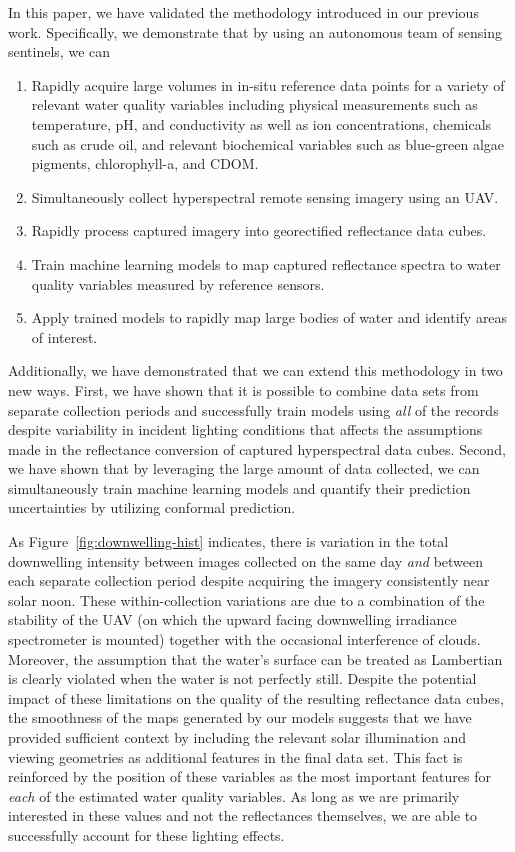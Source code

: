 \documentclass[remotesensing,article,submit,pdftex,moreauthors]{Definitions/mdpi}
\begin{document}
In this paper, we have validated the methodology introduced in our previous work\cite{robotTeam1}. Specifically, we demonstrate that by using an autonomous team of sensing sentinels, we can
\begin{enumerate}
    \item Rapidly acquire large volumes in in-situ reference data points for a variety of relevant water quality variables including physical measurements such as temperature, pH, and conductivity as well as ion concentrations, chemicals such as crude oil, and relevant biochemical variables such as blue-green algae pigments, chlorophyll-a, and CDOM. 
    \item Simultaneously collect hyperspectral remote sensing imagery using an UAV.
    \item Rapidly process captured imagery into georectified reflectance data cubes.
    \item Train machine learning models to map captured reflectance spectra to water quality variables measured by reference sensors.
    \item Apply trained models to rapidly map large bodies of water and identify areas of interest.
\end{enumerate}
Additionally, we have demonstrated that we can extend this methodology in two new ways. First, we have shown that it is possible to combine data sets from separate collection periods and successfully train models using \textit{all} of the records despite variability in incident lighting conditions that affects the assumptions made in the reflectance conversion of captured hyperspectral data cubes. Second, we have shown that by leveraging the large amount of data collected, we can simultaneously train machine learning models and quantify their prediction uncertainties by utilizing conformal prediction. 

As Figure~\ref{fig:downwelling-hist} indicates, there is variation in the total downwelling intensity between images collected on the same day \textit{and} between each separate collection period despite acquiring the imagery consistently near solar noon. These within-collection variations are due to a combination of the stability of the UAV (on which the upward facing downwelling irradiance spectrometer is mounted) together with the occasional interference of clouds. Moreover, the assumption that the water's surface can be treated as Lambertian is clearly violated when the water is not perfectly still. Despite the potential impact of these limitations on the quality of the resulting reflectance data cubes, the smoothness of the maps generated by our models suggests that we have provided sufficient context by including the relevant solar illumination and viewing geometries as additional features in the final data set.  This fact is reinforced by the position of these variables as the most important features for \textit{each} of the estimated water quality variables. As long as we are primarily interested in these values and not the reflectances themselves, we are able to successfully account for these lighting effects.
\end{document}
